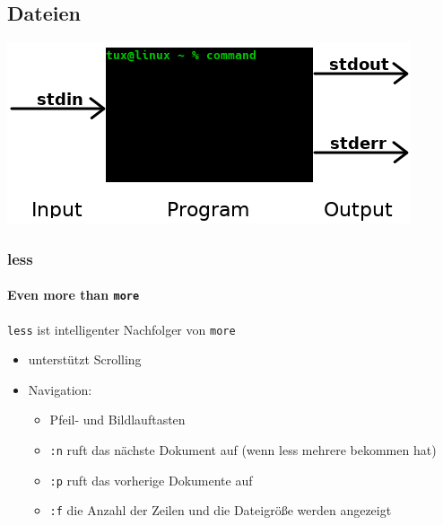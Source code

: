 \documentclass[12pt,utf8]{beamer}
\begin{document}
\subsection{Dateien}
\begin{frame}
	\centering\includegraphics[scale=0.65]{res/IOE}
\end{frame}

\begin{frame}
	\Huge\centering{$|$~~~$>$}
\end{frame}


\begin{frame}
\frametitle{less}
\framesubtitle{Even more than \texttt{more}}
\texttt{less} ist intelligenter Nachfolger von \texttt{more}
\begin{itemize}
	\item unterstützt Scrolling
	\item Navigation:
	\begin{itemize}[<+->]
		\item Pfeil- und Bildlauftasten
		\item \texttt{:n} ruft das nächste Dokument auf (wenn less mehrere bekommen hat)
		\item \texttt{:p} ruft das vorherige Dokumente auf
		\item \texttt{:f} die Anzahl der Zeilen und die Dateigröße werden angezeigt
	\end{itemize}
\end{itemize}
\end{frame}
\end{document}
